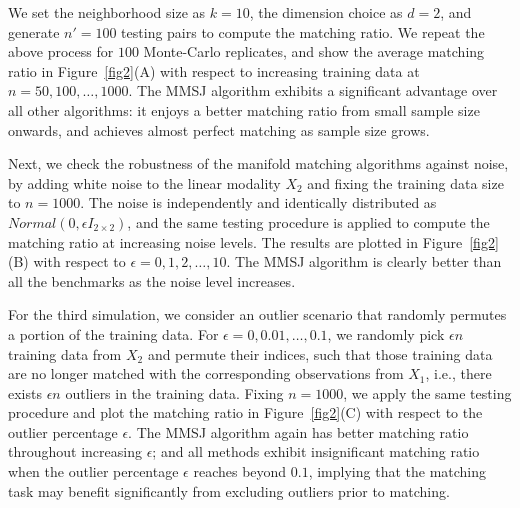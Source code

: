 \documentclass[times,twocolumn,final]{elsarticle}
\begin{document}
We set the neighborhood size as $k=10$, the dimension choice as $d=2$, and generate $n'=100$ testing pairs to compute the matching ratio. We repeat the above process for $100$ Monte-Carlo replicates, and show the average matching ratio in Figure~\ref{fig2}(A) with respect to increasing training data at $n=50,100,\ldots,1000$. 
The MMSJ algorithm exhibits a significant advantage over all other algorithms: it enjoys a better matching ratio from small sample size onwards, and achieves almost perfect matching as sample size grows.

Next, we check the robustness of the manifold matching algorithms against noise, by adding white noise to the linear modality $X_{2}$ and fixing the training data size to $n=1000$. The noise is independently and identically distributed as $Normal(0, \epsilon I_{2 \times 2})$, and the same testing procedure is applied to compute the matching ratio at increasing noise levels. The results are plotted in Figure~\ref{fig2}(B) with respect to $\epsilon = 0,1,2,\ldots,10$. The MMSJ algorithm is clearly better than all the benchmarks as the noise level increases.

For the third simulation, we consider an outlier scenario that randomly permutes a portion of the training data. For $\epsilon=0,0.01,\ldots,0.1$, we randomly pick $\epsilon n$ training data from $X_{2}$ and permute their indices, such that those training data are no longer matched with the corresponding observations from $X_{1}$, i.e., there exists $\epsilon n$ outliers in the training data. Fixing $n=1000$, we apply the same testing procedure and plot the matching ratio in Figure~\ref{fig2}(C) with respect to the outlier percentage $\epsilon$. The MMSJ algorithm again has better matching ratio throughout increasing $\epsilon$; and all methods exhibit insignificant matching ratio when the outlier percentage $\epsilon$ reaches beyond $0.1$, implying that the matching task may benefit significantly from excluding outliers prior to matching.

\end{document}
